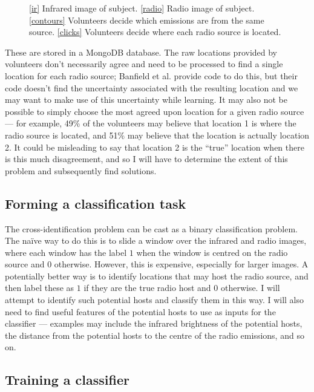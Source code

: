 \documentclass[a4paper]{article}
\begin{document}
\begin{figure}[!h]
\begin{subfigure}[b]{0.24\linewidth}
                \caption{}
                \label{clicks}
            \end{subfigure}
            \caption{\eqref{ir} Infrared image of subject. \eqref{radio} Radio image of subject. \eqref{contours} Volunteers decide which emissions are from the same source. \eqref{clicks} Volunteers decide where each radio source is located.}
        \end{figure}

        These are stored in a MongoDB database. The raw locations provided by volunteers don't necessarily agree and need to be processed to find a single location for each radio source; Banfield et al.\cite{banfield15} provide code to do this, but their code doesn't find the uncertainty associated with the resulting location and we may want to make use of this uncertainty while learning. It may also not be possible to simply choose the most agreed upon location for a given radio source --- for example, 49\% of the volunteers may believe that location 1 is where the radio source is located, and 51\% may believe that the location is actually location 2. It could be misleading to say that location 2 is the ``true'' location when there is this much disagreement, and so I will have to determine the extent of this problem and subsequently find solutions.

    \subsection*{Forming a classification task}

        The cross-identification problem can be cast as a binary classification problem. The naïve way to do this is to slide a window over the infrared and radio images, where each window has the label $1$ when the window is centred on the radio source and $0$ otherwise. However, this is expensive, especially for larger images. A potentially better way is to identify locations that may host the radio source, and then label these as $1$ if they are the true radio host and $0$ otherwise. I will attempt to identify such potential hosts and classify them in this way. I will also need to find useful features of the potential hosts to use as inputs for the classifier --- examples may include the infrared brightness of the potential hosts, the distance from the potential hosts to the centre of the radio emissions, and so on.

    \subsection*{Training a classifier}
\end{document}

